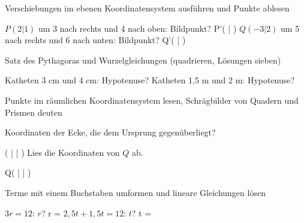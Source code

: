 \setcounter{aufgabe}{0}

\begin{aufgabe}{Verschiebungen im ebenen Koordinatensystem ausführen und Punkte ablesen}
\begin{teile}
\teil $P(2 | 1)$ um 3 nach rechts und 4 nach oben: Bildpunkt? P'( \leerfeld | \leerfeld )
\teil $Q(-3 | 2)$ um 5 nach rechts und 6 nach unten: Bildpunkt? Q'( \leerfeld | \leerfeld )
\end{teile}
\end{aufgabe}

\begin{aufgabe}{Satz des Pythagoras und Wurzelgleichungen (quadrieren, Lösungen sieben)}
\begin{teile}
\teil Katheten 3 cm und 4 cm: Hypotenuse? \leerfeld[cm]
\teil Katheten 1,5 m und 2 m: Hypotenuse? \leerfeld[m]
\end{teile}
\end{aufgabe}

\begin{aufgabe}{Punkte im räumlichen Koordinatensystem lesen, Schrägbilder von Quadern und Prismen deuten}
\begin{teile}
\teil Koordinaten der Ecke, die dem Ursprung gegenüberliegt?

\begin{ksys3}  \end{ksys3}
( \leerfeld | \leerfeld | \leerfeld )
\teil Lies die Koordinaten von $Q$ ab.

\begin{ksys3}  \end{ksys3}
Q( \leerfeld | \leerfeld | \leerfeld )
\end{teile}
\end{aufgabe}

\begin{aufgabe}{Terme mit einem Buchstaben umformen und lineare Gleichungen lösen}
\begin{teile}
\teil $3r = 12$: $r$? r = \leerfeld
\teil $2{,}5t + 1{,}5t = 12$: $t$? t = \leerfeld
\end{teile}
\end{aufgabe}

